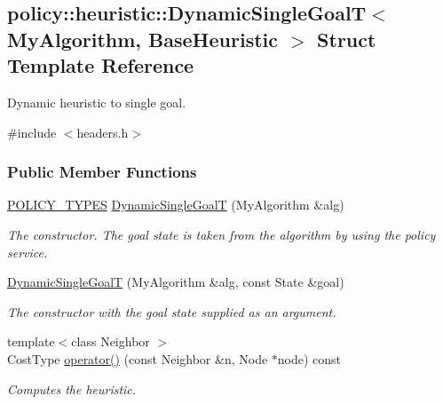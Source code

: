 \hypertarget{structpolicy_1_1heuristic_1_1DynamicSingleGoalT}{}\subsection{policy\+:\+:heuristic\+:\+:Dynamic\+Single\+GoalT$<$ My\+Algorithm, Base\+Heuristic $>$ Struct Template Reference}
\label{structpolicy_1_1heuristic_1_1DynamicSingleGoalT}


Dynamic heuristic to single goal.  




{\ttfamily \#include $<$headers.\+h$>$}

\subsubsection*{Public Member Functions}
\begin{DoxyCompactItemize}
\item 
\hyperlink{extensions_2shared__policies_2headers_8h_ae70a06fa4631780beea14971eb36a562}{P\+O\+L\+I\+C\+Y\+\_\+\+T\+Y\+P\+ES} \hyperlink{structpolicy_1_1heuristic_1_1DynamicSingleGoalT_a33d0f883028601e90e2051a141ac84d1}{Dynamic\+Single\+GoalT} (My\+Algorithm \&alg)
\begin{DoxyCompactList}\small\item\em The constructor. The goal state is taken from the algorithm by using the policy service. \end{DoxyCompactList}\item 
\hyperlink{structpolicy_1_1heuristic_1_1DynamicSingleGoalT_ae0b18acb35b562633881bb7c63cc6d6e}{Dynamic\+Single\+GoalT} (My\+Algorithm \&alg, const State \&goal)
\begin{DoxyCompactList}\small\item\em The constructor with the goal state supplied as an argument. \end{DoxyCompactList}\item 
{\footnotesize template$<$class Neighbor $>$ }\\Cost\+Type \hyperlink{structpolicy_1_1heuristic_1_1DynamicSingleGoalT_a22c7cd08bed2769575ed591a022ed6ab}{operator()} (const Neighbor \&n, Node $\ast$node) const 
\begin{DoxyCompactList}\small\item\em Computes the heuristic. \end{DoxyCompactList}\end{DoxyCompactItemize}
